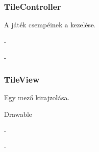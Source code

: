 \subsubsection{TileController}
\begin{class-template-responsibility}
    A játék csempéinek a kezelése.
\end{class-template-responsibility}
\begin{class-template-interface}
    -
\end{class-template-interface}
\begin{class-template-baseclass}
    -
\end{class-template-baseclass}
\begin{class-template-attribute}
\end{class-template-attribute}
\begin{class-template-method}
\end{class-template-method}

\subsubsection{TileView}
\begin{class-template-responsibility}
    Egy mező kirajzolása.
\end{class-template-responsibility}
\begin{class-template-interface}
    Drawable
\end{class-template-interface}
\begin{class-template-baseclass}
    -
\end{class-template-baseclass}
\begin{class-template-attribute}
\end{class-template-attribute}
\begin{class-template-method}
    -
\end{class-template-method}

